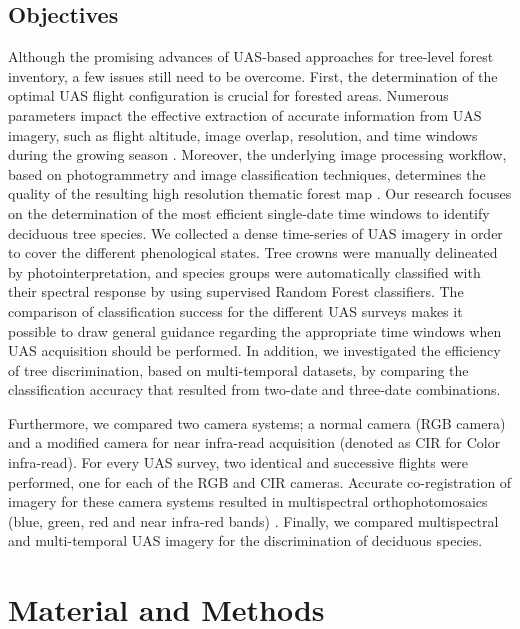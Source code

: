 \documentclass[remotesensing,article,submit,moreauthors,pdftex,12pt,a4paper]{mdpi} %
\begin{document}
\subsection{Objectives}

Although the promising advances of UAS-based approaches for tree-level forest inventory, a few issues still need to be overcome. 
First, the determination of the optimal UAS flight configuration is crucial for forested areas. 
Numerous parameters impact the effective extraction of accurate information from UAS imagery, such as flight altitude, image overlap, resolution, and time windows during the growing season \cite{dandois_high_2013}. 
Moreover, the underlying image processing workflow, based on photogrammetry and image classification techniques, determines the quality of the resulting high resolution thematic forest map \cite{lisein_photogrammetric_2013}.
Our research focuses on the determination of the most efficient single-date time windows to identify deciduous tree species. 
We collected a dense time-series of UAS imagery in order to cover the different phenological states. 
Tree crowns were manually delineated by photointerpretation, and species groups were automatically classified with their spectral response by using supervised Random Forest classifiers. 
The comparison of classification success for the different UAS surveys makes it possible to draw general guidance regarding the appropriate time windows when UAS acquisition should be performed. 
In addition, we investigated the efficiency of tree discrimination, based on multi-temporal datasets, by comparing the classification accuracy that resulted from two-date and three-date combinations.
 
Furthermore, we compared two camera systems; a normal camera (RGB camera) and a modified camera for near infra-read acquisition (denoted as CIR for Color infra-read). 
For every UAS survey, two identical and successive flights were performed, one for each of the RGB and CIR cameras. 
Accurate co-registration of imagery for these camera systems resulted in multispectral orthophotomosaics (blue, green, red and near infra-red bands) \cite{key_comparison_2001}. 
Finally, we compared multispectral and multi-temporal UAS imagery for the discrimination of deciduous species.


 

\section{Material and Methods}
\end{document}
